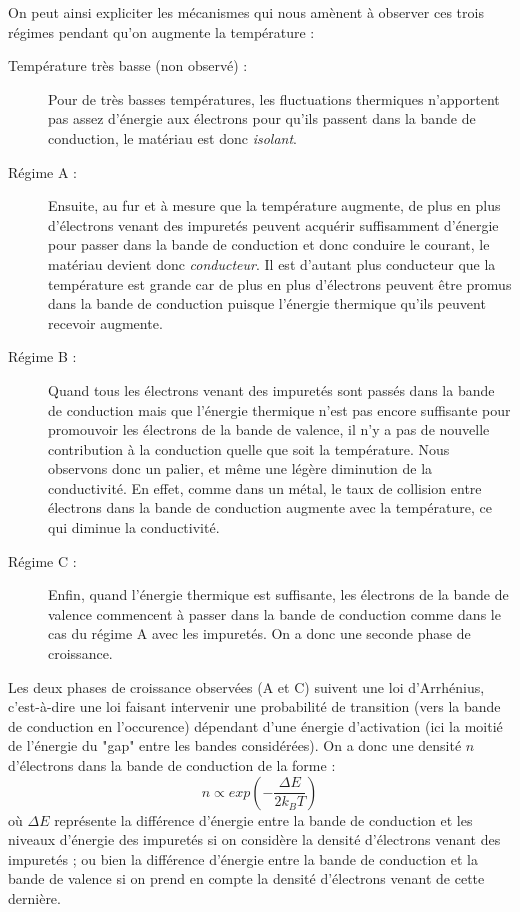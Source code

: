 On peut ainsi expliciter les mécanismes qui nous amènent à observer ces trois régimes pendant qu'on augmente la température : 
\begin{description}
\item[Température très basse (non observé) : ] Pour de très basses températures, les fluctuations thermiques n'apportent pas assez d'énergie aux électrons pour qu'ils passent dans la bande de conduction, le matériau est donc \emph{isolant}.
\item[Régime A : ] Ensuite, au fur et à mesure que la température augmente, de plus en plus d'électrons venant des impuretés peuvent acquérir suffisamment d'énergie pour passer dans la bande de conduction et donc conduire le courant, le matériau devient donc \emph{conducteur}. Il est d'autant plus conducteur que la température est grande car de plus en plus d'électrons peuvent être promus dans la bande de conduction puisque l'énergie thermique qu'ils peuvent recevoir augmente.
\item[Régime B : ] Quand tous les électrons venant des impuretés sont passés dans la bande de conduction mais que l'énergie thermique n'est pas encore suffisante pour promouvoir les électrons de la bande de valence, il n'y a pas de nouvelle contribution à la conduction quelle que soit la température. Nous observons donc un palier, et même une légère diminution de la conductivité. En effet, comme dans un métal, le taux de collision entre électrons dans la bande de conduction augmente avec la température, ce qui diminue la conductivité.
\item[Régime C : ] Enfin, quand l'énergie thermique est suffisante, les électrons de la bande de valence commencent à passer dans la bande de conduction comme dans le cas du régime A avec les impuretés. On a donc une seconde phase de croissance.
\end{description}

Les deux phases de croissance observées (A et C) suivent une loi d'Arrhénius, c'est-à-dire une loi faisant intervenir une probabilité de transition (vers la bande de conduction en l'occurence) dépendant d'une énergie d'activation (ici la moitié de l'énergie du "gap" entre les bandes considérées). On a donc une densité $n$ d'électrons dans la bande de conduction de la forme : 
\begin{equation}
	n \propto exp \left( - \frac{\Delta E}{2 k_{B} T} \right)
\end{equation}
où $\Delta E$ représente la différence d'énergie entre la bande de conduction et les niveaux d'énergie des impuretés si on considère la densité d'électrons venant des impuretés ; ou bien la différence d'énergie entre la bande de conduction et la bande de valence si on prend en compte la densité d'électrons venant de cette dernière.

